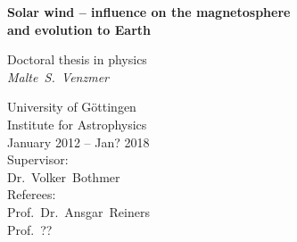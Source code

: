 
\begin{titlepage}
	\begin{center}
	
	
		\vspace*{10mm}
		\Large

		\textbf{Solar wind -- influence on the magnetosphere\\and evolution to Earth} 
		
		\vspace{15mm}
		\large
		Doctoral thesis in physics\\
		\vspace{15mm}
		\textit{Malte~S.~Venzmer}\\
		\vspace{10mm}
		
		
		\vspace{10mm}

		University of Göttingen\\
		\vspace{5mm}
		Institute for Astrophysics\\
		\vspace{5mm}
		January 2012 -- Jan? 2018\\
		\vspace{15mm}
		Supervisor:\\
		Dr.~Volker~Bothmer\\
		\vspace{5mm}
		Referees:\\
		Prof.~Dr.~Ansgar~Reiners\\
		Prof.~??\\
		
		
	\end{center}
\end{titlepage}

